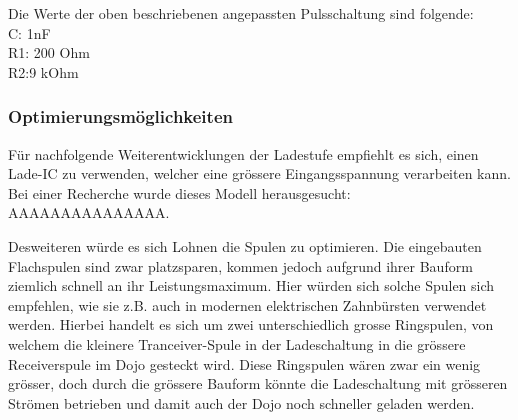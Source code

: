 Die Werte der oben beschriebenen angepassten Pulsschaltung sind folgende:\\
C: 1nF\\
R1: 200 Ohm\\
R2:9 kOhm\\

\subsubsection*{Optimierungsmöglichkeiten}\label{sec:optimierung}
Für nachfolgende Weiterentwicklungen der Ladestufe empfiehlt es sich, einen Lade-IC zu verwenden, welcher eine grössere Eingangsspannung verarbeiten kann. Bei einer Recherche wurde dieses Modell herausgesucht: AAAAAAAAAAAAAAA.

Desweiteren würde es sich Lohnen die Spulen zu optimieren. Die eingebauten Flachspulen sind zwar platzsparen, kommen jedoch aufgrund ihrer Bauform ziemlich schnell an ihr Leistungsmaximum. Hier würden sich solche Spulen sich empfehlen, wie sie z.B. auch in modernen elektrischen Zahnbürsten verwendet werden. Hierbei handelt es sich um zwei unterschiedlich grosse Ringspulen, von welchem die kleinere Tranceiver-Spule in der Ladeschaltung in die grössere Receiverspule  im Dojo gesteckt wird. Diese Ringspulen wären zwar ein wenig grösser, doch durch die grössere Bauform könnte die Ladeschaltung mit grösseren Strömen betrieben und damit auch der Dojo noch schneller geladen werden.